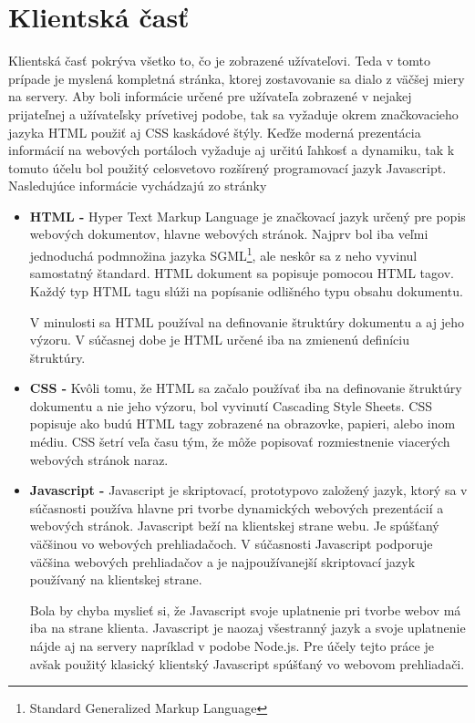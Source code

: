 \section{Klientská časť}
\label{sec:klient}
Klientská časť pokrýva všetko to, čo je zobrazené užívateľovi. Teda v tomto prípade je myslená kompletná stránka, ktorej zostavovanie sa dialo z väčšej miery na servery. Aby boli informácie určené pre užívateľa zobrazené v nejakej prijateľnej a užívateľsky prívetivej podobe, tak sa vyžaduje okrem značkovacieho jazyka HTML použiť aj CSS kaskádové štýly. Keďže moderná prezentácia informácií na webových portáloch vyžaduje aj určitú ľahkosť a dynamiku, tak k tomuto účelu bol použitý celosvetovo rozšírený programovací jazyk Javascript. Nasledujúce informácie vychádzajú zo stránky \cite{w3}

\begin{itemize} 
\item \textbf{HTML -} Hyper Text Markup Language je značkovací jazyk určený pre popis webových dokumentov, hlavne webových stránok. Najprv bol iba veľmi jednoduchá podmnožina jazyka SGML\footnote{Standard Generalized Markup Language}, ale neskôr sa z neho vyvinul samostatný štandard. HTML dokument sa popisuje pomocou HTML tagov. Každý typ HTML tagu slúži na popísanie odlišného typu obsahu dokumentu.  

V minulosti sa HTML používal na definovanie štruktúry dokumentu a aj jeho výzoru. V súčasnej dobe je HTML určené iba na zmienenú definíciu štruktúry.

\item \textbf{CSS -} Kvôli tomu, že HTML sa začalo používať iba na definovanie štruktúry dokumentu a nie jeho výzoru, bol vyvinutí Cascading Style Sheets. CSS popisuje ako budú HTML tagy zobrazené na obrazovke, papieri, alebo inom médiu. CSS šetrí veľa času tým, že môže popisovať rozmiestnenie viacerých webových stránok naraz.

\item \textbf{Javascript -} Javascript je skriptovací, prototypovo založený jazyk, ktorý sa v súčasnosti používa hlavne pri tvorbe dynamických webových prezentácií a webových stránok. Javascript beží na klientskej strane webu. Je spúšťaný väčšinou vo webových prehliadačoch. V súčasnosti Javascript podporuje väčšina webových prehliadačov a je najpoužívanejší skriptovací jazyk používaný na klientskej strane. 

Bola by chyba myslieť si, že Javascript svoje uplatnenie pri tvorbe webov má iba na strane klienta. Javascript je naozaj všestranný jazyk a svoje uplatnenie nájde aj na servery napríklad v podobe Node.js. Pre účely tejto práce je avšak použitý klasický klientský Javascript spúšťaný vo webovom prehliadači.


\end{itemize}
